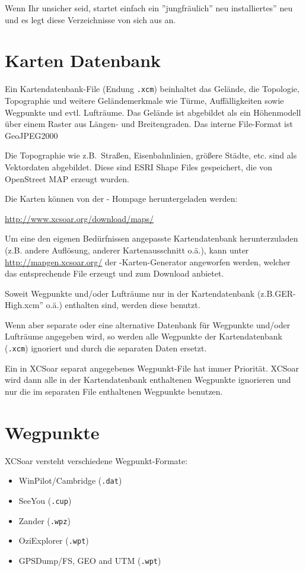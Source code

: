 Wenn Ihr unsicher seid, startet einfach ein ''jungfräulich'' neu installiertes'' \xc neu und es legt diese
Verzeichnisse von sich aus an.


\section{Karten Datenbank}\label{sec:map}

Ein Kartendatenbank-File (Endung \verb|.xcm|) beinhaltet das Gelände, die Topologie, Topographie und
weitere Geländemerkmale wie Türme, Auffälligkeiten sowie Wegpunkte und evtl. Lufträume.  Das
Gelände ist abgebildet als ein Höhenmodell über einem Raster aus Längen- und Breitengraden. Das interne
File-Format ist GeoJPEG2000

Die Topographie wie z.B.\ Straßen, Eisenbahnlinien, größere Städte, etc. sind als Vektordaten abgebildet.
Diese sind ESRI Shape Files gespeichert, die von OpenStreet MAP erzeugt wurden.

Die Karten können von der  \xc - Hompage heruntergeladen werden:

\url{http://www.xcsoar.org/download/maps/}

Um eine den eigenen Bedürfnissen angepasste Kartendatenbank herunterzuladen (z.B. andere Auflösung,
anderer Kartenausschnitt o.ä.), kann unter \url{http://mapgen.xcsoar.org/}  der \xc-Karten-Generator
angeworfen werden, welcher das entsprechende File erzeugt und zum Download
anbietet.

Soweit Wegpunkte und/oder Lufträume nur in der Kartendatenbank (z.B.\verb''GER-High.xcm'' o.ä.) enthalten sind,
werden diese benutzt.

Wenn aber separate oder eine alternative Datenbank für Wegpunkte und/oder Lufträume angegeben wird, so werden alle Wegpunkte der Kartendatenbank (\verb".xcm") ignoriert und durch die separaten Daten ersetzt.

Ein in \textsf{XCSoar} separat angegebenes Wegpunkt-File hat immer Priorität. \textsf{XCSoar} wird dann alle in der Kartendatenbank enthaltenen Wegpunkte ignorieren und nur die im separaten File enthaltenen Wegpunkte benutzen.


\section{Wegpunkte}
 \textsf{XCSoar} versteht verschiedene Wegpunkt-Formate:

\begin{itemize}
\item WinPilot/Cambridge (\verb|.dat|)
\item SeeYou (\verb|.cup|)
\item Zander (\verb|.wpz|)
\item OziExplorer (\verb|.wpt|)
\item GPSDump/FS, GEO and UTM (\verb|.wpt|)
\end{itemize}

